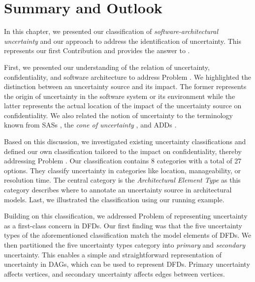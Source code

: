 \section{Summary and Outlook}%
\label{sec:classification:summary}

In this chapter, we presented our classification of \emph{software-architectural uncertainty} and our approach to address the identification of uncertainty.
This represents our first Contribution  and provides the answer to .

First, we presented our understanding of the relation of uncertainty, confidentiality, and software architecture to address Problem .
We highlighted the distinction between an uncertainty source and its impact.
The former represents the origin of uncertainty in the software system or its environment while the latter represents the actual location of the impact of the uncertainty source on confidentiality.
We also related the notion of uncertainty to the terminology known from \acfp{SAS} \cite{weyns_introduction_2020}, the \emph{cone of uncertainty} \cite{mcconnell_software_1998}, and \acfp{ADD} \cite{kruchten_ontology_2004,jansen_software_2005}.

Based on this discussion, we investigated existing uncertainty classifications \cite{walker_defining_2003,perez-palacin_uncertainties_2014,ramirez_taxonomy_2012,mahdavi-hezavehi_classification_2017,bures_capturing_2020} and defined our own classification tailored to the impact on confidentiality, thereby addressing Problem .
Our classification contains 8 categories with a total of 27 options.
They classify uncertainty in categories like location, manageability, or resolution time.
The central category is the \emph{Architectural Element Type} as this category describes where to annotate an uncertainty source in architectural models.
Last, we illustrated the classification using our running example.

Building on this classification, we addressed Problem  of representing uncertainty as a first-class concern in \acp{DFD}.
Our first finding was that the five uncertainty types of the aforementioned classification match the model elements of \acp{DFD}.
We then partitioned the five uncertainty types category into \emph{primary} and \emph{secondary} uncertainty.
This enables a simple and straightforward representation of uncertainty in \acp{DAG}, which can be used to represent \acp{DFD}.
Primary uncertainty affects vertices, and secondary uncertainty affects edges between vertices.

